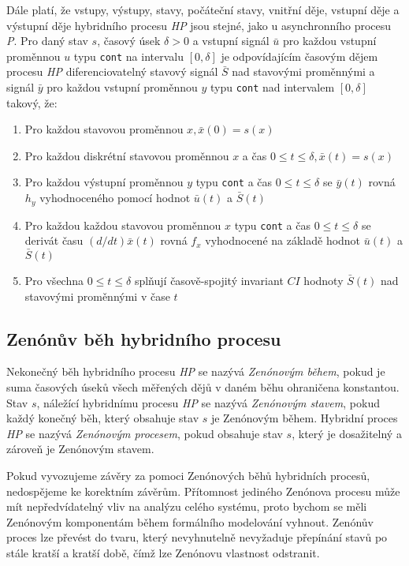 \documentclass[conference,a4paper]{IEEEtran-CZ}
\begin{document}
\medskip

Dále platí, že vstupy, výstupy, stavy, počáteční stavy, vnitřní děje, vstupní děje a výstupní děje 
hybridního procesu \textit{HP} jsou stejné, jako u asynchronního procesu \textit{P}. Pro daný stav $s$, časový úsek 
$\delta > 0$ a vstupní signál $\bar{u}$ pro každou vstupní proměnnou $u$ typu \texttt{cont} na intervalu
$[0,\delta]$ je odpovídajícím časovým dějem procesu \textit{HP} diferenciovatelný stavový signál  $\bar{S}$
nad stavovými proměnnými a signál  $\bar{y}$ pro každou vstupní proměnnou $y$ typu \texttt{cont} nad
intervalem $[0,\delta]$ takový, že:\cite{Rajeev:2015}

\begin{enumerate}
  \item Pro každou stavovou proměnnou $x, \bar{x}(0) = s(x)$
  \item Pro každou diskrétní stavovou proměnnou $x$ a čas $0 \leq t \leq \delta, \bar{x}(t) = s(x)$
  \item Pro každou výstupní proměnnou $y$ typu \texttt{cont} a čas $0 \leq t \leq \delta$ se $\bar{y}(t)$ rovná $h_y$ vyhodnoceného pomocí
	hodnot $\bar{u}(t)$ a $\bar{S}(t)$
  \item Pro každou každou stavovou proměnnou $x$ typu \texttt{cont} a čas $0 \leq t \leq \delta$ se derivát času $(d/dt)\bar{x}(t)$ rovná 
	$f_x$ vyhodnocené na základě hodnot $\bar{u}(t)$ a $\bar{S}(t)$
  \item Pro všechna $0 \leq t \leq \delta$ splňují časově-spojitý invariant $CI$ hodnoty $\bar{S}(t)$ nad stavovými proměnnými v čase $t$
\end{enumerate}

\subsection{Zenónův běh hybridního procesu}

Nekonečný běh hybridního procesu \textit{HP} se nazývá \textit{Zenónovým během}, pokud je suma 
časových úseků všech měřených dějů v daném běhu ohraničena konstantou. Stav $s$, náležící
hybridnímu procesu \textit{HP} se nazývá \textit{Zenónovým stavem}, pokud každý konečný běh, 
který obsahuje stav $s$ je Zenónovým během. Hybridní proces \textit{HP} se nazývá 
\textit{Zenónovým procesem}, pokud obsahuje stav $s$, který je dosažitelný a zároveň je Zenónovým 
stavem.

Pokud vyvozujeme závěry za pomoci Zenónových běhů hybridních procesů, nedospějeme ke korektním závěrům. 
Přítomnost  jediného Zenónova procesu může mít nepředvídatelný vliv na analýzu celého systému, proto bychom
se měli Zenónovým komponentám  během formálního modelování vyhnout. Zenónův proces lze převést
do tvaru, který nevyhnutelně nevyžaduje přepínání stavů po stále kratší a kratší době, čímž lze Zenónovu
vlastnost odstranit.\cite{Rajeev:2015}
\end{document}
